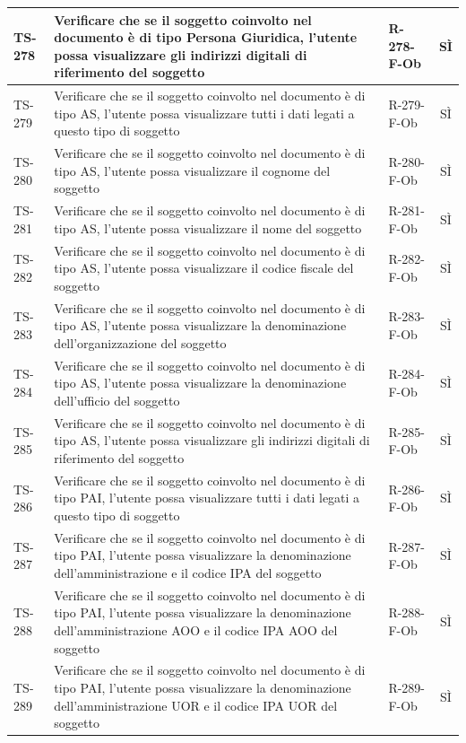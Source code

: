 \documentclass[a4paper,12pt]{article}
\begin{document}
\begin{longtable}{|p{1.5cm}|p{8.3cm}|p{2.4cm}|c|}
\hline
TS-278 & Verificare che se il soggetto coinvolto nel documento è di tipo Persona Giuridica, l'utente possa visualizzare gli indirizzi digitali di riferimento del soggetto & R-278-F-Ob & SÌ \\
\hline
TS-279 & Verificare che se il soggetto coinvolto nel documento è di tipo AS, l'utente possa visualizzare tutti i dati legati a questo tipo di soggetto & R-279-F-Ob & SÌ \\
\hline
TS-280 & Verificare che se il soggetto coinvolto nel documento è di tipo AS, l'utente possa visualizzare il cognome del soggetto & R-280-F-Ob & SÌ \\
\hline
TS-281 & Verificare che se il soggetto coinvolto nel documento è di tipo AS, l'utente possa visualizzare il nome del soggetto & R-281-F-Ob & SÌ \\
\hline
TS-282 & Verificare che se il soggetto coinvolto nel documento è di tipo AS, l'utente possa visualizzare il codice fiscale del soggetto & R-282-F-Ob & SÌ \\
\hline
TS-283 & Verificare che se il soggetto coinvolto nel documento è di tipo AS, l'utente possa visualizzare la denominazione dell'organizzazione del soggetto & R-283-F-Ob & SÌ \\
\hline
TS-284 & Verificare che se il soggetto coinvolto nel documento è di tipo AS, l'utente possa visualizzare la denominazione dell'ufficio del soggetto & R-284-F-Ob & SÌ \\
\hline
TS-285 & Verificare che se il soggetto coinvolto nel documento è di tipo AS, l'utente possa visualizzare gli indirizzi digitali di riferimento del soggetto & R-285-F-Ob & SÌ \\
\hline
TS-286 & Verificare che se il soggetto coinvolto nel documento è di tipo PAI, l'utente possa visualizzare tutti i dati legati a questo tipo di soggetto & R-286-F-Ob & SÌ \\
\hline
TS-287 & Verificare che se il soggetto coinvolto nel documento è di tipo PAI, l'utente possa visualizzare la denominazione dell'amministrazione e il codice IPA del soggetto & R-287-F-Ob & SÌ \\
\hline
TS-288 & Verificare che se il soggetto coinvolto nel documento è di tipo PAI, l'utente possa visualizzare la denominazione dell'amministrazione AOO e il codice IPA AOO del soggetto & R-288-F-Ob & SÌ \\
\hline
TS-289 & Verificare che se il soggetto coinvolto nel documento è di tipo PAI, l'utente possa visualizzare la denominazione dell'amministrazione UOR e il codice IPA UOR del soggetto & R-289-F-Ob & SÌ \\

\end{longtable}
\end{document}
